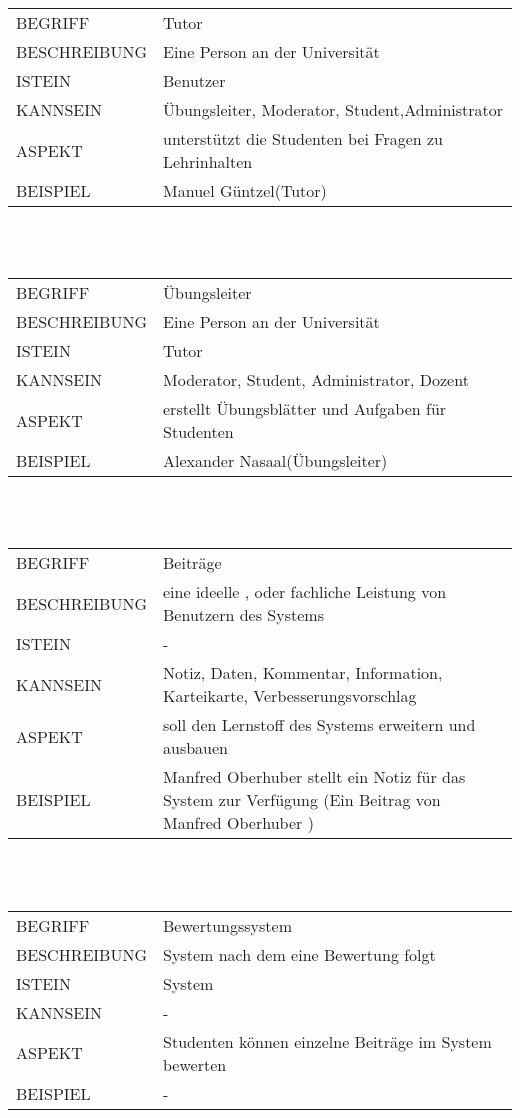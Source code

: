 \documentclass[12pt,a4paper]{article}
\begin{document}
\begin{tabular}{l p{10cm}}
BEGRIFF 	 & Tutor \\ 
BESCHREIBUNG & Eine Person an der Universität\\ 
ISTEIN   	 & Benutzer\\
KANNSEIN 	 & Übungsleiter, Moderator, Student,Administrator\\ 
ASPEKT   	 & unterstützt die Studenten bei Fragen zu Lehrinhalten\\
BEISPIEL 	 & Manuel Güntzel(Tutor)\\
\hline
\end{tabular}\\\\  

\begin{tabular}{l p{10cm}}
BEGRIFF 	 & Übungsleiter \\ 
BESCHREIBUNG & Eine Person an der Universität\\ 
ISTEIN   	 & Tutor\\
KANNSEIN 	 & Moderator, Student, Administrator, Dozent \\ 
ASPEKT   	 & erstellt Übungsblätter und Aufgaben für Studenten \\
BEISPIEL 	 & Alexander Nasaal(Übungsleiter)\\
\hline
\end{tabular}\\\\  

\begin{tabular}{l p{10cm}}
BEGRIFF 	 & Beiträge \\ 
BESCHREIBUNG & eine ideelle , oder fachliche Leistung von Benutzern des Systems \\ 
ISTEIN   	 &  -\\
KANNSEIN 	 & Notiz, Daten, Kommentar, Information, Karteikarte, Verbesserungsvorschlag\\ 
ASPEKT   	 & soll den Lernstoff des Systems erweitern und ausbauen\\
BEISPIEL 	 & Manfred Oberhuber stellt ein Notiz für das System zur Verfügung
			 (Ein Beitrag von Manfred Oberhuber )\\
\hline
\end{tabular}\\\\  

\begin{tabular}{l p{10cm}}
BEGRIFF 	 & Bewertungssystem \\ 
BESCHREIBUNG & System nach dem eine Bewertung folgt\\ 
ISTEIN   	 & System\\
KANNSEIN 	 & - \\ 
ASPEKT   	 & Studenten können einzelne Beiträge im System bewerten\\
BEISPIEL 	 & - \\
\hline
\end{tabular}\\\\  
\end{document}
